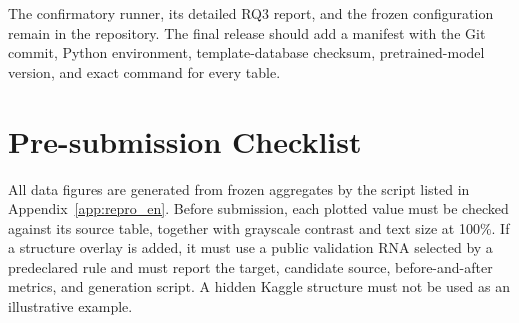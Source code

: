 \documentclass[12pt,a4paper,oneside]{report}
\begin{document}
The confirmatory runner, its detailed RQ3 report, and the frozen configuration remain in
the repository. The final release should add a manifest with the Git commit, Python
environment, template-database checksum, pretrained-model version, and exact command for
every table.

\chapter{Pre-submission Checklist}

All data figures are generated from frozen aggregates by the script listed in
Appendix~\ref{app:repro_en}. Before submission, each plotted value must be checked against
its source table, together with grayscale contrast and text size at 100\%. If a structure
overlay is added, it must use a public validation RNA selected by a predeclared rule and
must report the target, candidate source, before-and-after metrics, and generation script.
A hidden Kaggle structure must not be used as an illustrative example.


\end{document}

